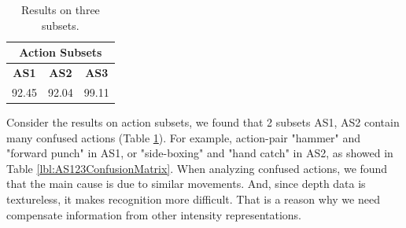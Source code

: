 \documentclass[review]{elsarticle}
\begin{document}
\begin{table}[H]
	\begin{center}
		\begin{tabular}{ccc}
		
		       \multicolumn{ 3}{c}{{\bf Action Subsets}} \\
		\hline
		     {\bf AS1} &      {\bf AS2} &      {\bf AS3} \\
		\hline
		        92.45  &         92.04  &         99.11  \\
		
		\end{tabular}
	\end{center}
	\caption{\label{lbl:MBHandAS123}Results on three subsets.}
\end{table}

Consider the results on action subsets, we found that 2 subsets AS1, AS2 contain many confused actions (Table \ref{lbl:MBHandAS123}). For example, action-pair "hammer" and "forward punch" in AS1, or "side-boxing" and "hand catch" in AS2, as showed in Table \ref{lbl:AS123ConfusionMatrix}. When analyzing confused actions, we found that the main cause is due to similar movements. And, since depth data is textureless, it makes recognition more difficult. That is a reason why we need compensate information from other intensity representations.
\end{document}
